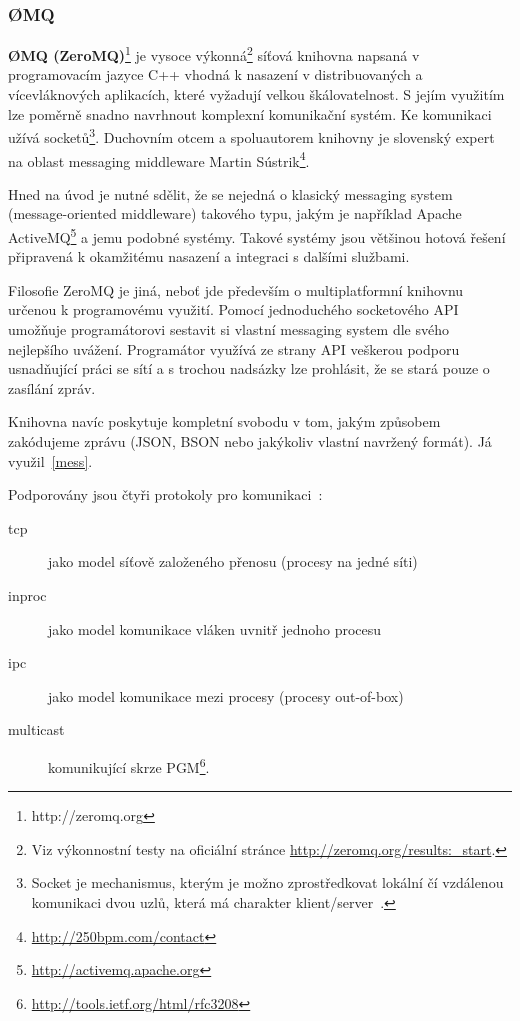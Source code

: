\documentclass[thesis=M,czech]{FITthesis}[2014/05/07]
\begin{document}
\subsubsection{ØMQ}
\textbf{ØMQ (ZeroMQ)}\footnote{http://zeromq.org} je vysoce výkonná\footnote{Viz výkonnostní testy na oficiální stránce \url{http://zeromq.org/results:_start}.} síťová knihovna napsaná v programovacím jazyce C++ vhodná k nasazení v distribuovaných a vícevláknových aplikacích, které vyžadují velkou škálovatelnost. S jejím využitím lze poměrně snadno navrhnout komplexní komunikační systém. Ke komunikaci užívá socketů\footnote{Socket je mechanismus, kterým je možno zprostředkovat lokální čí vzdálenou komunikaci dvou uzlů, která má charakter klient/server~\cite{socket}.}. Duchovním otcem a spoluautorem knihovny je slovenský expert na oblast messaging middleware Martin Sústrik\footnote{\url{http://250bpm.com/contact}}.

Hned na úvod je nutné sdělit, že se nejedná o klasický messaging system (message-oriented middleware) takového typu, jakým je například Apache ActiveMQ\footnote{\url{http://activemq.apache.org}} a jemu podobné systémy. Takové systémy jsou většinou hotová řešení připravená k okamžitému nasazení a integraci s dalšími službami. 

Filosofie ZeroMQ je jiná, neboť jde především o multiplatformní knihovnu určenou k programovému využití. Pomocí jednoduchého socketového API umožňuje programátorovi sestavit si vlastní messaging system dle svého nejlepšího uvážení. Programátor využívá ze strany API veškerou podporu usnadňující práci se sítí a s trochou nadsázky lze prohlásit, že se stará pouze o zasílání zpráv.

Knihovna navíc poskytuje kompletní svobodu v tom, jakým způsobem zakódujeme zprávu (JSON, BSON nebo jakýkoliv vlastní navržený formát). Já využil~\ref{mess}.

Podporovány jsou čtyři protokoly pro komunikaci~\cite{zeromq1}:

\begin{description}
	\item[tcp] jako model síťově založeného přenosu (procesy na jedné síti)
	\item[inproc] jako model komunikace vláken uvnitř jednoho procesu
	\item[ipc] jako model komunikace mezi procesy (procesy out-of-box)
	\item[multicast]	komunikující skrze PGM\footnote{\url{http://tools.ietf.org/html/rfc3208}}.
\end{description}
\end{document}
